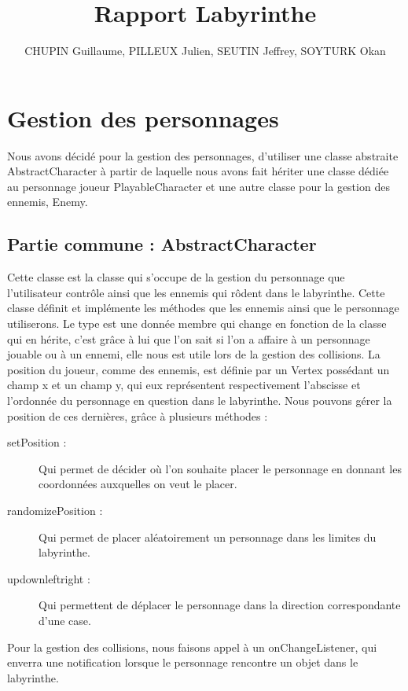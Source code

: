 \documentclass [10pt, a4paper]{article}
\title {Rapport Labyrinthe}
\author {CHUPIN Guillaume, PILLEUX Julien, SEUTIN Jeffrey, SOYTURK Okan}
\begin{document}
\maketitle
\newpage

\tableofcontents
\newpage

\section {Gestion des personnages}
Nous avons décidé pour la gestion des personnages, d'utiliser une classe abstraite AbstractCharacter à partir de laquelle nous avons fait hériter une classe dédiée au personnage joueur PlayableCharacter et une autre classe pour la gestion des ennemis, Enemy.

\subsection {Partie commune : AbstractCharacter}
Cette classe est la classe qui s'occupe de la gestion du personnage que l'utilisateur contrôle ainsi que les ennemis qui rôdent dans le labyrinthe. Cette classe définit et implémente les méthodes que les ennemis ainsi que le personnage utiliserons. Le type est une donnée membre qui change en fonction de la classe qui en hérite, c'est grâce à lui que l'on sait si l'on a affaire à un personnage jouable ou à un ennemi, elle nous est utile lors de la gestion des collisions. La position du joueur, comme des ennemis, est définie par un Vertex possédant un champ x et un champ y, qui eux représentent respectivement l'abscisse et l'ordonnée du personnage en question dans le labyrinthe. Nous pouvons gérer la position de ces dernières, grâce à plusieurs méthodes :
\begin {description}
\item  [setPosition :]  Qui permet de décider où l'on souhaite placer le personnage en donnant les coordonnées auxquelles on veut le placer.
\item  [randomizePosition :]   Qui permet de placer aléatoirement un personnage dans les limites du labyrinthe. 
\item  [up\/down\/left\/right\/ :]  Qui permettent de déplacer le personnage dans la direction correspondante d'une case.
\end   {description}
Pour la gestion des collisions, nous faisons appel à un onChangeListener, qui enverra une notification lorsque le personnage rencontre un objet dans le labyrinthe.
\end{document}
